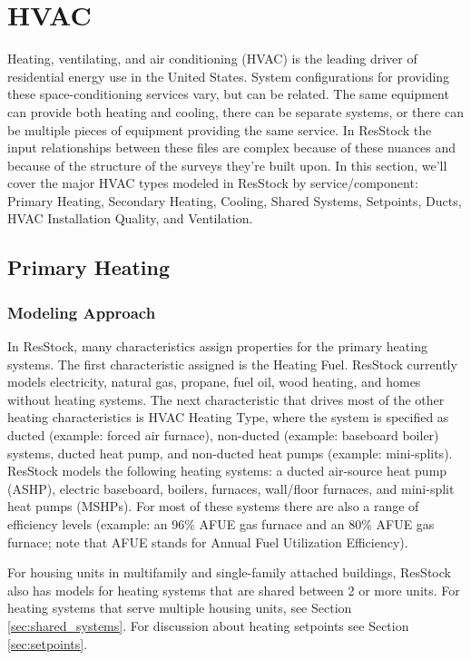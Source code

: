 \section{HVAC}
Heating, ventilating, and air conditioning (HVAC) is the leading driver of residential energy use in the United States. System configurations for providing these space-conditioning services vary, but can be related. The same equipment can provide both heating and cooling, there can be separate systems, or there can be multiple pieces of equipment providing the same service. In ResStock the input relationships between these files are complex because of these nuances and because of the structure of the surveys they're built upon. In this section, we'll cover the major HVAC types modeled in ResStock by service/component: Primary Heating, Secondary Heating, Cooling, Shared Systems, Setpoints, Ducts, HVAC Installation Quality, and Ventilation.
\subsection{Primary Heating}
\subsubsection{Modeling Approach}
In ResStock, many characteristics assign properties for the primary heating systems. The first characteristic assigned is the Heating Fuel. ResStock currently models electricity, natural gas, propane, fuel oil, wood heating, and homes without heating systems. The next characteristic that drives most of the other heating characteristics is HVAC Heating Type, where the system is specified as ducted (example: forced air furnace), non-ducted (example: baseboard boiler) systems, ducted heat pump, and non-ducted heat pumps (example: mini-splits). ResStock models the following heating systems: a ducted air-source heat pump (ASHP), electric baseboard, boilers, furnaces, wall/floor furnaces, and mini-split heat pumps (MSHPs). For most of these systems there are also a range of efficiency levels (example: an 96\% AFUE gas furnace and an 80\% AFUE gas furnace; note that AFUE stands for Annual Fuel Utilization Efficiency).

For housing units in multifamily and single-family attached buildings, ResStock also has models for heating systems that are shared between 2 or more units. For heating systems that serve multiple housing units, see Section \ref{sec:shared_systems}. For discussion about heating setpoints see Section \ref{sec:setpoints}.

